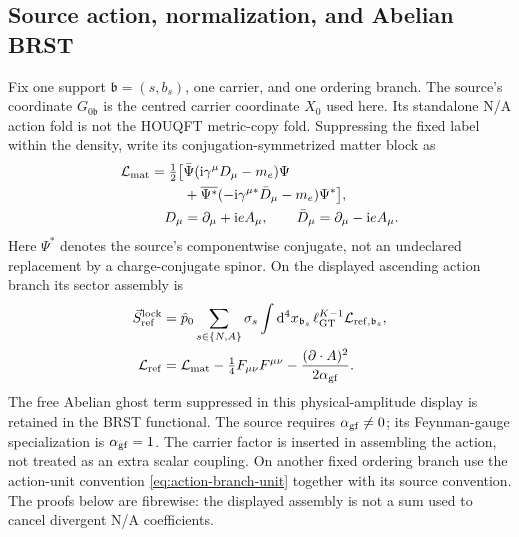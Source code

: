 \documentclass[final,5p,times,twocolumn,numbers,nopreprintline]{elsarticle}
\numberwithin{equation}{section}
\theoremstyle{definition}
\theoremstyle{remark}
\newcommand{\dd}{\mathop{}\!\mathrm d}
\newcommand{\ii}{\mathrm i}
\newcommand{\bb}{\mathfrak b}
\begin{document}
\subsection{Source action, normalization, and Abelian BRST}
\label{sec:OQED-action}

Fix one support \(\bb=(s,b_s)\), one carrier, and one ordering branch.
The source's coordinate \(G_{0\bb}\) is the centred carrier coordinate
\(X_0\) used here. Its standalone N/A action fold is not the HOUQFT
metric-copy fold. Suppressing the fixed label within the density, write
its conjugation-symmetrized matter block as
\begin{equation}
\begin{aligned}
 \mathcal L_{\rm mat}
 =\tfrac12\bigl[&\bar\Psi(\ii\gamma^\mu D_\mu-m_e)\Psi\\
 &+\overline{\Psi^*}(-\ii\gamma^{\mu *}\bar D_\mu-m_e)\Psi^*\bigr],\\
 D_\mu&=\partial_\mu+\ii e A_\mu,\qquad
 \bar D_\mu=\partial_\mu-\ii e A_\mu .
\end{aligned}
\label{eq:OQED-source-matter}
\end{equation}
Here \(\Psi^*\) denotes the source's componentwise conjugate, not an
undeclared replacement by a charge-conjugate spinor. On the displayed
ascending action branch its sector assembly is
\begin{equation}
\begin{aligned}
 \vec S_{\rm ref}^{\rm lock}
 &=\hat p_0\sum_{s\in\{N,A\}}\sigma_s
       \int\dd^4x_{\bb_s}\,\ell_{\rm GT}^{K-1}
       \mathcal L_{{\rm ref},\bb_s},\\
 \mathcal L_{\rm ref}
 &=\mathcal L_{\rm mat}-\tfrac14F_{\mu\nu}F^{\mu\nu}
       -\frac{(\partial\cdot A)^2}{2\alpha_{\rm gf}} .
\end{aligned}
\label{eq:OQED-source-action}
\end{equation}
The free Abelian ghost term suppressed in this physical-amplitude
display is retained in the BRST functional. The source requires
\(\alpha_{\rm gf}\ne0\); its Feynman-gauge specialization is
\(\alpha_{\rm gf}=1\). The carrier factor is inserted in assembling
the action, not treated as an extra scalar coupling. On another fixed
ordering branch use the action-unit convention
\eqref{eq:action-branch-unit} together with its source convention.
The proofs below are fibrewise: the displayed assembly is not a sum
used to cancel divergent N/A coefficients.
\end{document}
